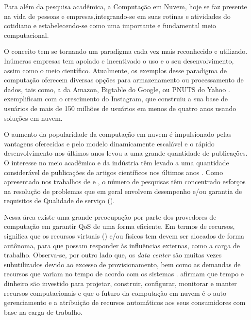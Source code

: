 \setcounter{page}{1}
Para além da pesquisa acadêmica, a Computação em Nuvem, hoje se faz presente na vida de pessoas e empresas,integrando-se em suas rotinas e atividades do cotidiano e estabelecendo-se como uma importante e fundamental meio computacional. 

O conceito tem se tornando um paradigma cada vez mais reconhecido e utilizado. Inúmeras empresas tem apoiado e incentivado o uso e o seu desenvolvimento, assim como o meio científico. Atualmente, os exemplos desse paradigma de computação oferecem diversas opções para armazenamento ou processamento de dados, tais como, a \textit{} da Amazon, Bigtable do Google, ou PNUTS do Yahoo \cite{Binnig2009}.  exemplificam com o crescimento do Instagram, que construiu a sua base de usuários de mais de 150 milhões de usuários em menos de quatro anos usando soluções em nuvem.

O aumento da popularidade da computação em nuvem é impulsionado pelas vantagens oferecidas e pelo modelo dinamicamente escalável e o rápido desenvolvimento nos últimos anos levou a uma grande quantidade de publicações. O interesse no meio acadêmico e da indústria têm levado a uma quantidade considerável de publicações de artigos científicos nos últimos anos \cite{Heilig2014}. Como apresentado nos trabalhos de  e , o número de pesquisas têm concentrado esforços na resolução de problemas que em geral envolvem desempenho e/ou garantia de requisitos de Qualidade de serviço (\textit{}). 

Nessa área existe uma grande preocupação por parte dos provedores de computação em garantir QoS de uma forma eficiente. Em termos de recursos, significa que os recursos virtuais (\textit{}) e/ou físicos tem devem ser alocados de forma autônoma, para que possam responder às influências externas, como a carga de trabalho. Observa-se, por outro lado que, os \textit{data center} são muitas vezes subutilizados devido ao excesso de provisionamento, bem como as demandas de recursos que variam no tempo de acordo com os sistemas \cite{Padala2007}.  afirmam que tempo e dinheiro são investido para projetar, construir, configurar, monitorar e manter recursos computacionais e que o futuro da computação em nuvem é o auto gerenciamento e a atribuição de recursos automáticos aos seus consumidores com base na carga de trabalho.

